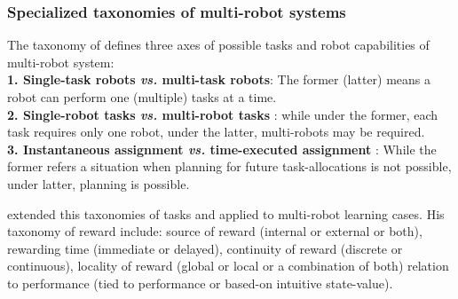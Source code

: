 \subsubsection*{Specialized taxonomies of multi-robot systems} 
The taxonomy of  defines three axes of possible tasks and robot capabilities of multi-robot system:\\
\textbf{1. Single-task robots  {\em vs.} multi-task robots}: The former (latter) means a robot can perform one (multiple) tasks at a time.\\
\textbf{2. Single-robot tasks  {\em vs.} multi-robot tasks }: while under the former, each task requires only one robot, under the latter, multi-robots may be required.\\
\textbf{3. Instantaneous assignment {\em vs.} time-executed assignment }: While the former refers a situation when planning for future task-allocations is not possible, under latter, planning is possible.

 extended this taxonomies of tasks and applied to multi-robot learning cases. His taxonomy of reward include: source of reward (internal or external or both), rewarding time (immediate or delayed), continuity of reward (discrete or continuous), locality of reward (global or local or a combination of both) relation to performance (tied to performance or based-on intuitive state-value).
